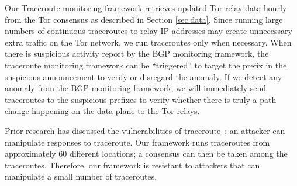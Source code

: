 Our Traceroute monitoring framework retrieves updated Tor relay data hourly from the Tor consensus as described in Section \ref{sec:data}. Since running large numbers of continuous traceroutes to relay IP addresses may create unnecessary extra traffic on the Tor network, we run traceroutes only when necessary.  When there is suspicious activity report by the BGP monitoring framework, the traceroute monitoring framework can be ``triggered'' to target the prefix in the suspicious announcement to verify or disregard the anomaly. If we detect any anomaly from the BGP monitoring framework, we will immediately send traceroutes to the suspicious prefixes to verify whether there is truly a path change happening on the data plane to the Tor relays. 

Prior research has discussed the vulnerabilities of traceroute~\cite{padmanabhan2003secure}; an attacker can manipulate responses to traceroute.  Our framework runs traceroutes from approximately 60 different locations; a consensus can then be taken among the traceroutes.  Therefore, our framework is resistant to attackers that can manipulate a small number of traceroutes.  

